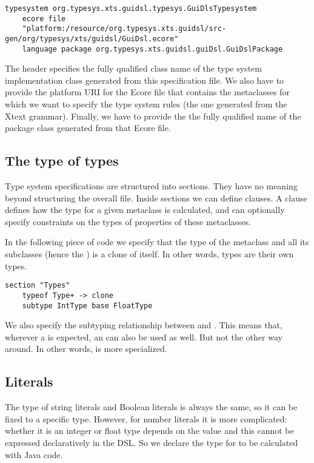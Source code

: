 \begin{lstlisting}[language=xts] 
typesystem org.typesys.xts.guidsl.typesys.GuiDlsTypesystem 
    ecore file 
    "platform:/resource/org.typesys.xts.guidsl/src-gen/org/typesys/xts/guidsl/GuiDsl.ecore"
    language package org.typesys.xts.guidsl.guiDsl.GuiDslPackage 
\end{lstlisting}

The header specifies the fully qualified class name of the type system
implementation class generated from this specification file. We also have to
provide the platform URI for the Ecore file that contains the metaclasses for
which we want to specify the type system rules (the one generated from the Xtext
grammar). Finally, we have to provide the the fully qualified name of the
package class generated from that Ecore file.

\subsection{The type of types}

Type system specifications  are structured into sections. They have no meaning
beyond structuring the overall file. Inside sections we can define 
clauses. A  clause defines how the type for a given metaclass is
calculated, and can optionally specify constraints on the types of properties of
these metaclasses.

In the following piece of code we specify  that the type
of the  metaclass and all its subclasses (hence the \ic{+}) is a clone of itself.
In other words, types are their own types.

\begin{lstlisting}[language=xts] 
section "Types"
    typeof Type+ -> clone
    subtype IntType base FloatType
\end{lstlisting}

We also specify the subtyping relationship between  and . This
means that, wherever a  is expected, an  can also be
used as well.  But not the other way around. In other words,  is more
specialized.

\subsection{Literals}

The type of string literals and Boolean literals is always the same, so it can
be fixed to a specific type.
However, for number literals it is more complicated:
whether it is an integer or float type depends on the value and this cannot be
expressed declaratively in the DSL. So we declare the type for
 to be calculated with Java code.


